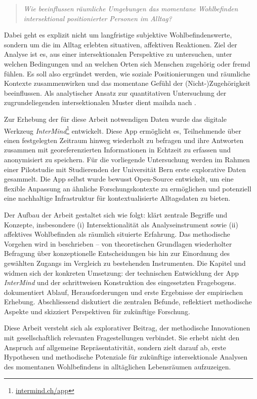 \begin{quote}
\emph{Wie beeinflussen räumliche Umgebungen das momentane Wohlbefinden intersektional positionierter Personen im Alltag?}
\end{quote}

Dabei geht es explizit nicht um langfristige subjektive Wohlbefindenswerte, sondern um die im Alltag erlebten situativen, affektiven Reaktionen. Ziel der Analyse ist es, aus einer intersektionalen Perspektive zu untersuchen, unter welchen Bedingungen und an welchen Orten sich Menschen zugehörig oder fremd fühlen. Es soll also ergründet werden, wie soziale Positionierungen und räumliche Kontexte zusammenwirken und das momentane Gefühl der (Nicht-)Zugehörigkeit beeinflussen. Als analytischer Ansatz zur quantitativen Untersuchung der zugrundeliegenden intersektionalen Muster dient \gls{maihda} nach \textcite{grossModellingIntersectionalityQuantitative2023}.

Zur Erhebung der für diese Arbeit notwendigen Daten wurde das digitale Werkzeug \emph{InterMind}\footnote{\href{https://intermind.ch/app}{intermind.ch/app}} entwickelt. Diese App ermöglicht es, Teilnehmende über einen festgelegten Zeitraum hinweg wiederholt zu befragen und ihre Antworten zusammen mit georeferenzierten Informationen in Echtzeit zu erfassen und anonymisiert zu speichern. Für die vorliegende Untersuchung werden im Rahmen einer Pilotstudie mit Studierenden der Universität Bern erste explorative Daten gesammelt. Die App selbst wurde bewusst Open-Source entwickelt, um eine flexible Anpassung an ähnliche Forschungskontexte zu ermöglichen und potenziell eine nachhaltige Infrastruktur für kontextualisierte Alltagsdaten zu bieten.


Der Aufbau der Arbeit gestaltet sich wie folgt:  klärt zentrale Begriffe und Konzepte, insbesondere (i) Intersektionalität als Analyseinstrument sowie (ii) affektives Wohlbefinden als räumlich situierte Erfahrung. Das methodische Vorgehen wird in  beschrieben – von theoretischen Grundlagen wiederholter Befragung über konzeptionelle Entscheidungen bis hin zur Einordnung des gewählten Zugangs im Vergleich zu bestehenden Instrumenten. Die Kapitel  und  widmen sich der konkreten Umsetzung: der technischen Entwicklung der App \textit{InterMind} und der schrittweisen Konstruktion des eingesetzten Fragebogens.  dokumentiert Ablauf, Herausforderungen und erste Ergebnisse der empirischen Erhebung. Abschliessend diskutiert  die zentralen Befunde, reflektiert methodische Aspekte und skizziert Perspektiven für zukünftige Forschung.

Diese Arbeit versteht sich als explorativer Beitrag, der methodische Innovationen mit gesellschaftlich relevanten Fragestellungen verbindet. Sie erhebt nicht den Anspruch auf allgemeine Repräsentativität, sondern zielt darauf ab, erste Hypothesen und methodische Potenziale für zukünftige intersektionale Analysen des momentanen Wohlbefindens in alltäglichen Lebensräumen aufzuzeigen.